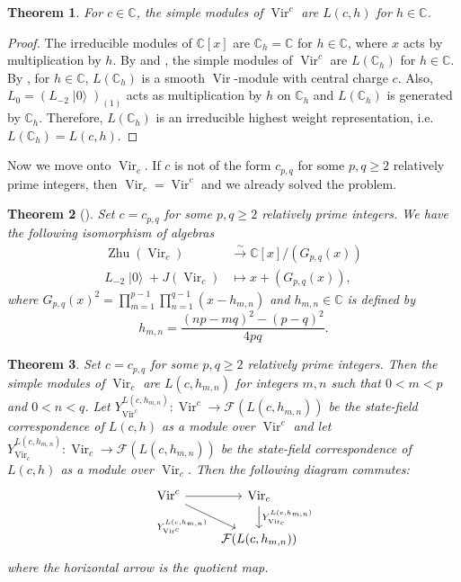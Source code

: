 \documentclass[a4paper, 12pt, reqno]{amsart}
\newtheorem{theorem}{Theorem}[section]
\theoremstyle{remark}
\numberwithin{equation}{subsection}
\DeclareMathOperator{\Vir}{Vir}
\DeclareMathOperator{\vac}{|0\rangle}
\DeclareMathOperator{\Zhu}{Zhu}
\begin{document}
\begin{theorem}
  \label{thr:40}
  For $c \in \mathbb{C}$, the simple modules of $\Vir^c$ are $L(c, h)$ for $h \in \mathbb{C}$.
\end{theorem}

\begin{proof}
  The irreducible modules of $\mathbb{C}[x]$ are $\mathbb{C}_h = \mathbb{C}$ for $h \in \mathbb{C}$, where $x$ acts by multiplication by $h$.
  By  and , the simple modules of $\Vir^c$ are $L(\mathbb{C}_h)$ for $h \in \mathbb{C}$.
  By , for $h \in \mathbb{C}$, $L(\mathbb{C}_h)$ is a smooth $\Vir$-module with central charge $c$.
  Also, $L_0 = (L_{-2}\vac)_{(1)}$ acts as multiplication by $h$ on $\mathbb{C}_h$ and $L(\mathbb{C}_h)$ is generated by $\mathbb{C}_h$.
  Therefore, $L(\mathbb{C}_h)$ is an irreducible highest weight representation, i.e. $L(\mathbb{C}_h) = L(c, h)$.
\end{proof}

Now we move onto $\Vir_c$.
If $c$ is not of the form $c_{p, q}$ for some $p, q \ge 2$ relatively prime integers, then $\Vir_c = \Vir^c$ and we already solved the problem.

\begin{theorem}[{\cite{wang_rationality_1993}}]
  \label{thr:41}
  Set $c = c_{p, q}$ for some $p, q \ge 2$ relatively prime integers.
  We have the following isomorphism of algebras
  \begin{align*}
    \Zhu(\Vir_c) &\xrightarrow{\sim} \mathbb{C}[x]/(G_{p, q}(x)) \\
    L_{-2}\vac +J(\Vir_c) &\mapsto x + (G_{p, q}(x)),
  \end{align*}
  where $G_{p ,q}(x)^2 = \prod_{m = 1}^{p - 1}\prod_{n = 1}^{q - 1}(x - h_{m, n})$ and $h_{m, n} \in \mathbb{C}$ is defined by
  \begin{equation}
    \label{eq:40}
    h_{m, n} = \frac{(np - mq)^2 - (p - q)^2}{4pq}.
  \end{equation}
\end{theorem}

\begin{theorem}
  \label{thr:42}
  Set $c = c_{p, q}$ for some $p, q \ge 2$ relatively prime integers.
  Then the simple modules of $\Vir_c$ are $L(c, h_{m, n})$ for integers $m, n$ such that $0 < m < p$ and $0 < n < q$.
  Let $Y^{L(c, h_{m, n})}_{\Vir^c}: \Vir^c \to \mathcal{F}(L(c, h_{m, n}))$ be the state-field correspondence of $L(c, h)$ as a module over $\Vir^c$ and let $Y^{L(c, h_{m, n})}_{\Vir_c}: \Vir_c \to \mathcal{F}(L(c, h_{m, n}))$ be the state-field correspondence of $L(c, h)$ as a module over $\Vir_c$.
  Then the following diagram commutes:
  \begin{equation*}
    \begin{tikzcd}
      \Vir^c \arrow[r] \arrow[rd, "{Y^{L(c, h_{m, n})}_{\Vir^c}}"'] & {\Vir_c} \arrow[d, "{Y^{L(c, h_{m, n})}_{\Vir_c}}"] \\
      & {\mathcal{F}(L(c, h_{m, n}))}
    \end{tikzcd}
  \end{equation*}
  where the horizontal arrow is the quotient map.
\end{theorem}
\end{document}
